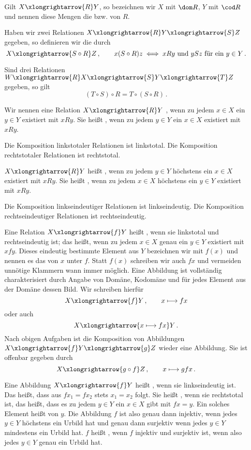 Gilt $X\xlongrightarrow{R}Y$, so bezeichnen wir $X$ mit $\dom R$, $Y$ mit $\cod R$ und nennen diese Mengen die  bzw.  von $R$.

Haben wir zwei Relationen $X\xlongrightarrow{R}Y\xlongrightarrow{S}Z$ gegeben, so definieren wir die  durch
\[
X\xlongrightarrow{S\circ R}Z\,,\qquad x(S\circ R)z\iff xRy\text{ und }ySz\text{ für ein }y\in Y\,.
\]
\begin{task}
Sind drei Relationen $W\xlongrightarrow{R}X\xlongrightarrow{S}Y\xlongrightarrow{T}Z$ gegeben, so gilt
\[(T\circ S)\circ R=T\circ(S\circ R)\,.\]
\end{task}
Wir nennen eine Relation $X\xlongrightarrow{R}Y$ , wenn zu jedem $x\in X$ ein $y\in Y$ existiert mit $xRy$. Sie heißt , wenn zu jedem $y\in Y$ ein $x\in X$ existiert mit $xRy$.
\begin{task}
Die Komposition linkstotaler Relationen ist linkstotal. Die Komposition rechtstotaler Relationen ist rechtstotal.
\end{task}
$X\xlongrightarrow{R}Y$ heißt , wenn zu jedem $y\in Y$ höchstens ein $x\in X$ existiert mit $xRy$. Sie heißt , wenn zu jedem $x\in X$ höchstens ein $y\in Y$ existiert mit $xRy$.
\begin{task}
Die Komposition linkseindeutiger Relationen ist linkseindeutig. Die Komposition rechtseindeutiger Relationen ist rechtseindeutig.
\end{task}
Eine Relation $X\xlongrightarrow{f}Y$ heißt , wenn sie linkstotal und rechtseindeutig ist; das heißt, wenn zu jedem $x\in X$ genau ein $y\in Y$ existiert mit $xfy$. Dieses eindeutig bestimmte Element aus $Y$ bezeichnen wir mit $f(x)$ und nennen es das  von $x$ unter $f$. Statt $f(x)$ schreiben wir auch $fx$ und vermeiden unnötige Klammern wann immer möglich. Eine Abbildung ist vollständig charakterisiert durch Angabe von Domäne, Kodomäne und für jedes Element aus der Domäne dessen Bild. Wir schreiben hierfür
\[
X\xlongrightarrow{f}Y\,,\qquad x\longmapsto fx
\]
oder auch
\[
X\xlongrightarrow{x\longmapsto fx}Y\,.
\]
Nach obigen Aufgaben ist die Komposition von Abbildungen $X\xlongrightarrow{f}Y\xlongrightarrow{g}Z$ wieder eine Abbildung. Sie ist offenbar gegeben durch
\[
X\xlongrightarrow{g\circ f}Z\,,\qquad x\longmapsto gfx\,.
\]

Eine Abbildung $X\xlongrightarrow{f}Y$ heißt , wenn sie linkseindeutig ist. Das heißt, dass aus $fx_1=fx_2$ stets $x_1=x_2$ folgt. Sie heißt , wenn sie rechtstotal ist, das heißt, dass es zu jedem $y\in Y$ ein $x\in X$ gibt mit $fx=y$. Ein solches Element heißt  von $y$. Die Abbildung $f$ ist also genau dann injektiv, wenn jedes $y\in Y$ höchstens ein Urbild hat und genau dann surjektiv wenn jedes $y\in Y$ mindestens ein Urbild hat. $f$ heißt , wenn $f$ injektiv und surjektiv ist, wenn also jedes $y\in Y$ genau ein Urbild hat.


